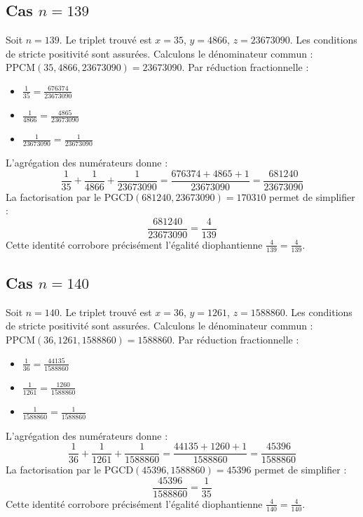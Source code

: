 \documentclass[11pt,a4paper]{article}
\begin{document}
\subsection{Cas $n = 139$}
Soit $n = 139$. Le triplet trouvé est $x = 35$, $y = 4866$, $z = 23673090$.
Les conditions de stricte positivité sont assurées.
Calculons le dénominateur commun : $\text{PPCM}(35, 4866, 23673090) = 23673090$.
Par réduction fractionnelle :
\begin{itemize}
    \item $\frac{1}{35} = \frac{676374}{23673090}$
    \item $\frac{1}{4866} = \frac{4865}{23673090}$
    \item $\frac{1}{23673090} = \frac{1}{23673090}$
\end{itemize}
L'agrégation des numérateurs donne :
$$ \frac{1}{35} + \frac{1}{4866} + \frac{1}{23673090} = \frac{676374 + 4865 + 1}{23673090} = \frac{681240}{23673090} $$
La factorisation par le $\text{PGCD}(681240, 23673090) = 170310$ permet de simplifier :
$$ \frac{681240}{23673090} = \frac{4}{139} $$
Cette identité corrobore précisément l'égalité diophantienne $\frac{4}{139} = \frac{4}{139}$.

\subsection{Cas $n = 140$}
Soit $n = 140$. Le triplet trouvé est $x = 36$, $y = 1261$, $z = 1588860$.
Les conditions de stricte positivité sont assurées.
Calculons le dénominateur commun : $\text{PPCM}(36, 1261, 1588860) = 1588860$.
Par réduction fractionnelle :
\begin{itemize}
    \item $\frac{1}{36} = \frac{44135}{1588860}$
    \item $\frac{1}{1261} = \frac{1260}{1588860}$
    \item $\frac{1}{1588860} = \frac{1}{1588860}$
\end{itemize}
L'agrégation des numérateurs donne :
$$ \frac{1}{36} + \frac{1}{1261} + \frac{1}{1588860} = \frac{44135 + 1260 + 1}{1588860} = \frac{45396}{1588860} $$
La factorisation par le $\text{PGCD}(45396, 1588860) = 45396$ permet de simplifier :
$$ \frac{45396}{1588860} = \frac{1}{35} $$
Cette identité corrobore précisément l'égalité diophantienne $\frac{4}{140} = \frac{4}{140}$.
\end{document}
